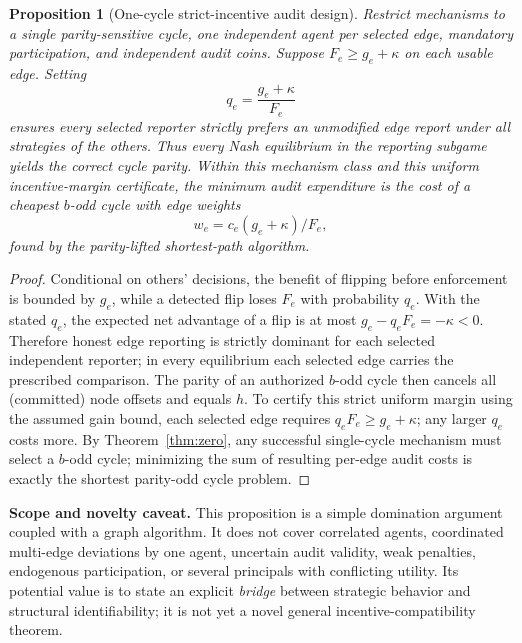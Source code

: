 \documentclass[10pt,a4paper]{article}
\newtheorem{proposition}[theorem]{Proposition}
\theoremstyle{definition}\newtheorem{definition}[theorem]{Definition}
\begin{document}
\begin{proposition}[One-cycle strict-incentive audit design]\label{prop:strategic}
Restrict mechanisms to a single parity-sensitive cycle, one independent agent per selected edge, mandatory participation, and independent audit coins. Suppose $F_e\ge g_e+\kappa$ on each usable edge. Setting
\begin{equation}\label{eq:incentives}
 q_e=\frac{g_e+\kappa}{F_e}
\end{equation}
ensures every selected reporter strictly prefers an unmodified edge report under all strategies of the others. Thus every Nash equilibrium in the reporting subgame yields the correct cycle parity. Within this mechanism class and this \emph{uniform incentive-margin certificate}, the minimum audit expenditure is the cost of a cheapest $b$-odd cycle with edge weights
\[
 w_e=c_e(g_e+\kappa)/F_e,
\]
found by the parity-lifted shortest-path algorithm.
\end{proposition}
\begin{proof}
Conditional on others' decisions, the benefit of flipping before enforcement is bounded by $g_e$, while a detected flip loses $F_e$ with probability $q_e$. With the stated $q_e$, the expected net advantage of a flip is at most $g_e-q_eF_e=-\kappa<0$. Therefore honest edge reporting is strictly dominant for each selected independent reporter; in every equilibrium each selected edge carries the prescribed comparison. The parity of an authorized $b$-odd cycle then cancels all (committed) node offsets and equals $h$. To certify this strict uniform margin using the assumed gain bound, each selected edge requires $q_eF_e\ge g_e+\kappa$; any larger $q_e$ costs more. By Theorem~\ref{thm:zero}, any successful single-cycle mechanism must select a $b$-odd cycle; minimizing the sum of resulting per-edge audit costs is exactly the shortest parity-odd cycle problem.
\end{proof}

\textbf{Scope and novelty caveat.} This proposition is a simple domination argument coupled with a graph algorithm. It does not cover correlated agents, coordinated multi-edge deviations by one agent, uncertain audit validity, weak penalties, endogenous participation, or several principals with conflicting utility. Its potential value is to state an explicit \emph{bridge} between strategic behavior and structural identifiability; it is not yet a novel general incentive-compatibility theorem.
\end{document}
